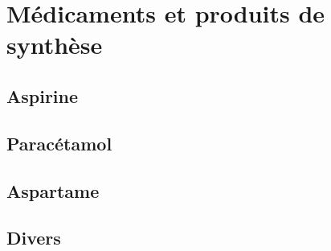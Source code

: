 \section{Médicaments et produits de synthèse}

\subsection{Aspirine}

\begin{boiteCodeTex}{}
  \chemfig{!\aspirineSemiDev}
  \chemfig{!\aspirine} \qq{}
  \chemfig{!\acideSalicylique}
\end{boiteCodeTex}
  
\subsection{Paracétamol}

\begin{boiteCodeTex}{}
  \chemfig{!\paracetamol}
  \chemfig{!\paracetamolSemiDev}
  \chemfig{!\paracetamolDev}
\end{boiteCodeTex}

\subsection{Aspartame}

\begin{boiteCodeTex}{}
  \chemfig{!\aspartame}
\end{boiteCodeTex}
  
\subsection{Divers}

\begin{boiteCodeTex}{}
  \chemfig{!\bisphenolA} \qq{}
  \chemfig{!\bisphenolASemiDev}
\end{boiteCodeTex}
